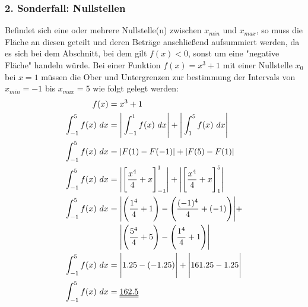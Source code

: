 \documentclass[a4paper,12pt]{article}
\begin{document}
\subsubsection{2. Sonderfall: Nullstellen}
Befindet sich eine oder mehrere Nullstelle(n) zwischen $x_{min}$ und $x_{max}$, so muss die Fläche an diesen geteilt und deren Beträge anschließend aufsummiert werden, 
da es sich bei dem Abschnitt, bei dem gilt $f(x) < 0$, sonst um eine "negative Fläche" handeln würde. Bei einer Funktion $f(x) = x^3 + 1$ mit einer Nullstelle 
$x_0$ bei $x = 1$ müssen die Ober und Untergrenzen zur bestimmung der Intervals von $x_{min} = -1$ bis $x_{max} = 5$ wie folgt gelegt werden:
\begin{equation*}
\begin{split}
f(x) & = x^3 + 1\\
\int_{-1}^5 f(x)\ dx & = \Bigg{|} \int_{-1}^1 f(x)\ dx \Bigg{|} + \Bigg{|} \int_1^5 f(x)\ dx\Bigg{|}\\
\int_{-1}^5 f(x)\ dx & = | F(1) - F(-1) | + | F(5) - F(1) |\\
\int_{-1}^5 f(x)\ dx & = \Bigg{|}\Bigg{[}\frac{x^4}{4} + x\Bigg{]}_{-1}^1\Bigg{|} + \Bigg{|}\Bigg{[}\frac{x^4}{4} + x\Bigg{]}_1^5\Bigg{|}\\
\int_{-1}^5 f(x)\ dx & = \Bigg{|}\Bigg{(}\frac{1^4}{4} + 1\Bigg{)} - \Bigg{(}\frac{(-1)^4}{4} + (-1)\Bigg{)}\Bigg{|} + \\
&\ \ \ \ \Bigg{|}\Bigg{(}\frac{5^4}{4} + 5 \Bigg{)} - \Bigg{(}\frac{1^4}{4} + 1\Bigg{)}\Bigg{|}\\
\int_{-1}^5 f(x)\ dx & = \Bigg{|} 1.25 - (-1.25)\Bigg{|} + \Bigg{|} 161.25 - 1.25\Bigg{|}\\
\int_{-1}^5 f(x)\ dx & = \underline{\underline{162.5}}
\end{split}
\end{equation*}
\pagebreak
\end{document}
